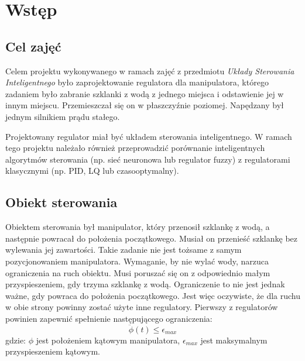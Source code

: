 \chapter{Wstęp}
\label{cha:wstep}

\section{Cel zajęć}

Celem projektu wykonywanego w ramach zajęć z przedmiotu \textit{Układy Sterowania Inteligentnego} było zaprojektowanie regulatora dla manipulatora, którego zadaniem było zabranie szklanki z wodą z jednego miejsca i odstawienie jej w innym miejscu. Przemieszczał się on w płaszczyźnie poziomej. Napędzany był jednym silnikiem prądu stałego.

Projektowany regulator miał być układem sterowania inteligentnego. W ramach tego projektu należało również przeprowadzić porównanie inteligentnych algorytmów sterowania (np. sieć neuronowa lub regulator fuzzy) z regulatorami klasycznymi (np. PID, LQ lub czasooptymalny).

\section{Obiekt sterowania}

Obiektem sterowania był manipulator, który przenosił szklankę z wodą, a następnie powracał do położenia początkowego. Musiał on przenieść szklankę bez wylewania jej zawartości. Takie zadanie nie jest tożsame z samym pozycjonowaniem manipulatora. Wymaganie, by nie wylać wody, narzuca ograniczenia na ruch obiektu. Musi poruszać się on z odpowiednio małym przyspieszeniem, gdy trzyma szklankę z wodą. Ograniczenie to nie jest jednak ważne, gdy powraca do położenia początkowego. Jest więc oczywiste, że dla ruchu w obie strony powinny zostać użyte inne regulatory. Pierwszy z regulatorów powinien zapewnić spełnienie następującego ograniczenia:
\begin{equation}
\ddot \phi(t) \leqslant \epsilon_{max}
\end{equation}
\noindent gdzie:\newline
\(\phi\) jest położeniem kątowym manipulatora,\newline
\(\epsilon_{max}\) jest maksymalnym przyspieszeniem kątowym.

